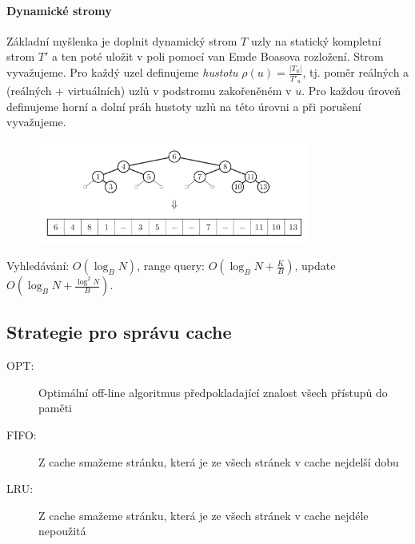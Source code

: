 \documentclass[11pt]{report} %
\numberwithin{equation}{section}
\begin{document}
\paragraph{Dynamické stromy}
Základní myšlenka je doplnit dynamický strom $T$  uzly na statický kompletní strom $T'$ a ten poté uložit v poli pomocí van Emde Boasova rozložení. Strom vyvažujeme. Pro každý uzel definujeme \textit{hustotu} $\rho(u) = \frac{|T_u|}{T'_u}$, tj. poměr reálných a (reálných + virtuálních) uzlů v podstromu zakořeněném v $u$. Pro každou úroveň definujeme horní a dolní práh hustoty uzlů na této úrovni a při porušení vyvažujeme.
\begin{figure}[H]
	\centering
	\includegraphics[width=0.8\textwidth]{img/dynamic_oblivious.png}
\end{figure}

Vyhledávání: $O(\log_B N)$, range query: $O(\log_B N + 	\frac{K}{B})$, update $O(\log_B N + \frac{\log^2N}{B})$.


\subsection{Strategie pro správu cache}
\begin{description}
	\item[OPT:] Optimální off-line algoritmus předpokladající znalost všech přístupů do paměti
	\item[FIFO:] Z cache smažeme stránku, která je ze všech stránek v cache nejdelší dobu
	\item[LRU:] Z cache smažeme stránku, která je ze všech stránek v cache nejdéle nepoužitá
\end{description}
\end{document}
